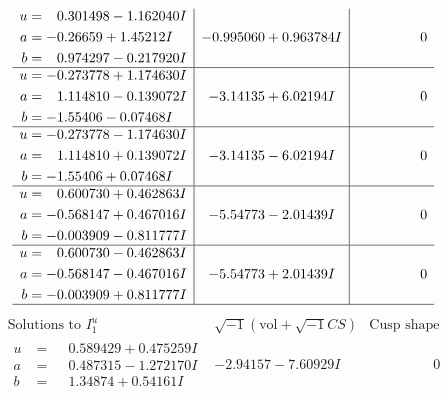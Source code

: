 \documentclass[1p]{elsarticle_modified}
\theoremstyle{definition}
\newcommand{\I}{\sqrt{-1}}
\begin{document}
$$\begin{array}{c|c|c}
\begin{aligned}
u &= \phantom{-}0.301498 - 1.162040 I \\
a &= -0.26659 + 1.45212 I \\
b &= \phantom{-}0.974297 - 0.217920 I\end{aligned}
 & -0.995060 + 0.963784 I & \phantom{-0.000000 } 0 \\ \hline\begin{aligned}
u &= -0.273778 + 1.174630 I \\
a &= \phantom{-}1.114810 - 0.139072 I \\
b &= -1.55406 - 0.07468 I\end{aligned}
 & -3.14135 + 6.02194 I & \phantom{-0.000000 } 0 \\ \hline\begin{aligned}
u &= -0.273778 - 1.174630 I \\
a &= \phantom{-}1.114810 + 0.139072 I \\
b &= -1.55406 + 0.07468 I\end{aligned}
 & -3.14135 - 6.02194 I & \phantom{-0.000000 } 0 \\ \hline\begin{aligned}
u &= \phantom{-}0.600730 + 0.462863 I \\
a &= -0.568147 + 0.467016 I \\
b &= -0.003909 - 0.811777 I\end{aligned}
 & -5.54773 - 2.01439 I & \phantom{-0.000000 } 0 \\ \hline\begin{aligned}
u &= \phantom{-}0.600730 - 0.462863 I \\
a &= -0.568147 - 0.467016 I \\
b &= -0.003909 + 0.811777 I\end{aligned}
 & -5.54773 + 2.01439 I & \phantom{-0.000000 } 0\\
 \hline 
 \end{array}$$\newpage$$\begin{array}{c|c|c}  
\text{Solutions to }I^u_{1}& \I (\text{vol} + \sqrt{-1}CS) & \text{Cusp shape}\\
 \hline 
\begin{aligned}
u &= \phantom{-}0.589429 + 0.475259 I \\
a &= \phantom{-}0.487315 - 1.272170 I \\
b &= \phantom{-}1.34874 + 0.54161 I\end{aligned}
 & -2.94157 - 7.60929 I & \phantom{-0.000000 } 0 \\ \hline\begin{aligned}

\end{aligned}
\end{array}$$
\end{document}
